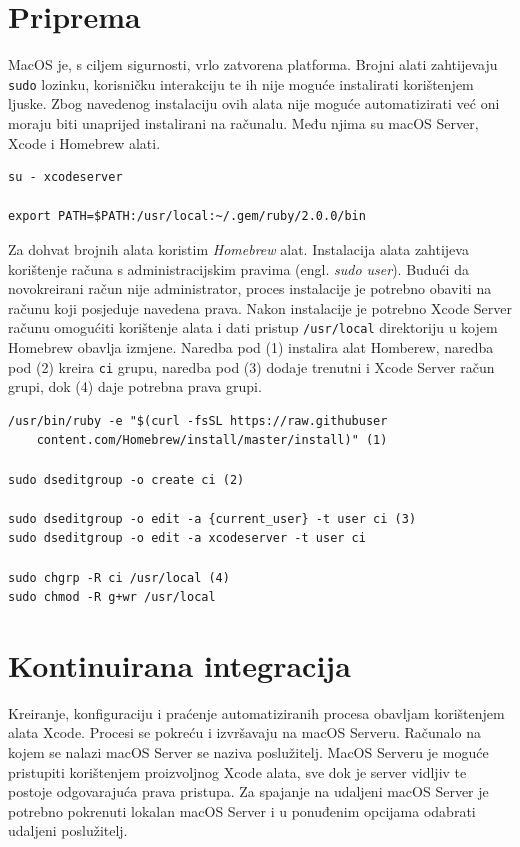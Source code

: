 \documentclass[times, utf8, diplomski, numeric]{fer}
\newcommand{\eng}[1]{(engl. \textit{#1})}
\begin{document}
\begin{appendices}
\section{Priprema} \label{PripremaAlata}

MacOS je, s ciljem sigurnosti, vrlo zatvorena platforma. Brojni alati zahtijevaju \verb|sudo| lozinku, korisničku interakciju te ih nije moguće instalirati korištenjem ljuske. Zbog navedenog instalaciju ovih alata nije moguće automatizirati već oni moraju biti unaprijed instalirani na računalu. Među njima su macOS Server, Xcode i Homebrew alati.

\begin{verbatim}
su - xcodeserver

export PATH=$PATH:/usr/local:~/.gem/ruby/2.0.0/bin
\end{verbatim}

Za dohvat brojnih alata koristim \textit{Homebrew} alat. Instalacija alata zahtijeva korištenje računa s administracijskim pravima \eng{sudo user}. Budući da novokreirani račun nije administrator, proces instalacije je potrebno obaviti na računu koji posjeduje navedena prava. Nakon instalacije je potrebno Xcode Server računu omogućiti korištenje alata i dati pristup \verb|/usr/local| direktoriju u kojem Homebrew obavlja izmjene. Naredba pod (1) instalira alat Homberew, naredba pod (2) kreira \verb|ci| grupu, naredba pod (3) dodaje trenutni i Xcode Server račun grupi, dok (4) daje potrebna prava grupi.

\begin{verbatim}
/usr/bin/ruby -e "$(curl -fsSL https://raw.githubuser
    content.com/Homebrew/install/master/install)" (1)

sudo dseditgroup -o create ci (2)

sudo dseditgroup -o edit -a {current_user} -t user ci (3)
sudo dseditgroup -o edit -a xcodeserver -t user ci

sudo chgrp -R ci /usr/local (4)
sudo chmod -R g+wr /usr/local
\end{verbatim}

\section{Kontinuirana integracija} \label{KontinuiranaIntegracija_DodatakB}

Kreiranje, konfiguraciju i praćenje automatiziranih procesa obavljam korištenjem alata Xcode. Procesi se pokreću i izvršavaju na macOS Serveru. Računalo na kojem se nalazi macOS Server se naziva poslužitelj. MacOS Serveru je moguće pristupiti korištenjem proizvoljnog Xcode alata, sve dok je server vidljiv te postoje odgovarajuća prava pristupa. Za spajanje na udaljeni macOS Server je potrebno pokrenuti lokalan macOS Server i u ponuđenim opcijama odabrati udaljeni poslužitelj.


\end{appendices}
\end{document}
